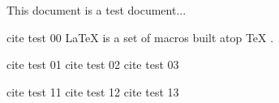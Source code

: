 \documentclass{article}
\begin{document}
This document is a test document...

cite test 00
\LaTeX{} \cite{lamport94} is a set of macros built atop \TeX{} \citep{texbook}.

cite test 01 \cite{ lamport94} 
cite test 02 \cite{ texbook}
cite test 03 \cite{texbook }

cite test 11 \citep{ lamport94}
cite test 12 \citep{ texbook}
cite test 13 \citep{texbook }
\end{document}
